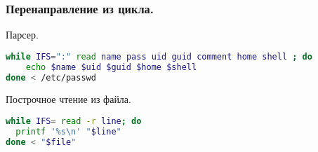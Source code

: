 \begin{frame}[fragile]
\frametitle{Перенаправление из цикла.}

  \begin{block}{Парсер.}
    \begin{lstlisting}[language=sh,frame=single]
while IFS=":" read name pass uid guid comment home shell ; do
    echo $name $uid $guid $home $shell 
done < /etc/passwd
    \end{lstlisting}
  \end{block}

  \begin{block}{Построчное чтение из файла.}
    \begin{lstlisting}[language=sh,frame=single]
while IFS= read -r line; do
  printf '%s\n' "$line"
done < "$file"
    \end{lstlisting}
  \end{block}
\end{frame}
